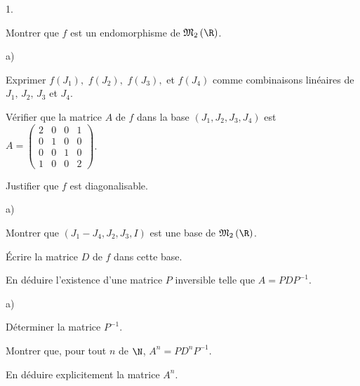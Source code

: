 \documentclass[11pt]{article}%
\begin{document}
\begin{noliste}{1.}
 \setlength{\itemsep}{4mm}
\item Montrer que $f$ est un endomorphisme de $\mathfrak{M}_{2}\left( 
\R\right) $.

\item 

\begin{noliste}{a)}
 \setlength{\itemsep}{2mm}
\item Exprimer $f\left( J_{1}\right),$ $f\left( J_{2}\right),$ $f\left(
J_{3}\right),$ et $f\left( J_{4}\right) $ comme combinaisons linéaires
de $
J_{1},\,J_{2},\,J_{3}$ et $J_{4}.$

\item Vérifier que la matrice $A$ de $f$ dans la base $\left(
J_{1},J_{2},J_{3},J_{4}\right) $ est $A = \left( 
\begin{array}{rrrr}
2 & 0 & 0 & 1 \\
0 & 1 & 0 & 0 \\
0 & 0 & 1 & 0 \\
1 & 0 & 0 & 2
\end{array}
\right) $.

\item Justifier que $f$ est diagonalisable.
\end{noliste}

\item 

\begin{noliste}{a)}
 \setlength{\itemsep}{2mm}
\item Montrer que $\left( J_{1}-J_{4},J_{2},J_{3},I\right) $ est une
base de 
$\mathfrak{M}_{2}\left( \R\right) $.

\item Écrire la matrice $D$ de $f$ dans cette base.

\item En déduire l'existence d'une matrice $P$ inversible telle que $
A = PDP^{-1}$.
\end{noliste}

\item 

\begin{noliste}{a)}
 \setlength{\itemsep}{2mm}
\item Déterminer la matrice $P^{-1}$.

\item Montrer que, pour tout $n$ de $\N$, $A^{n} = PD^{n}P^{-1}$.

\item En déduire explicitement la matrice $A^{n}$.
\end{noliste}
\end{noliste}
\end{document}
